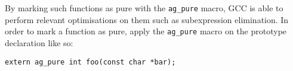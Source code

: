 By marking such functions as pure with the \texttt{ag\_pure} macro, GCC is able
to perform relevant optimisations on them such as subexpression elimination. In
order to mark a function as pure, apply the \texttt{ag\_pure} macro on the
prototype declaration like so:
\begin{lstlisting}[linewidth=1.0\linewidth]
extern ag_pure int foo(const char *bar);
\end{lstlisting}

